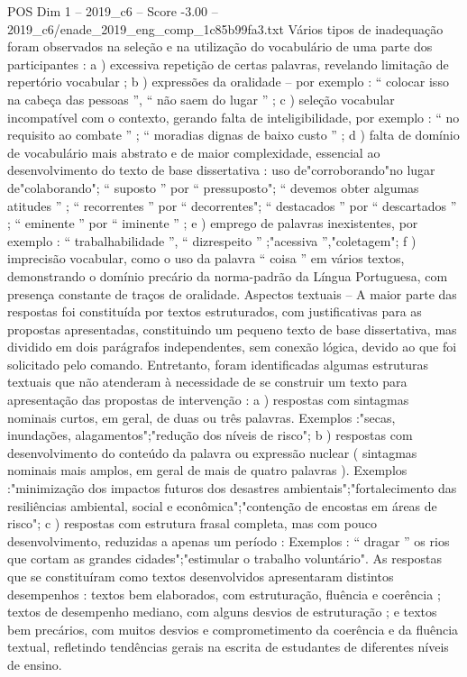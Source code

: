 \begin{textsample}{POS Dim 1 – 2019\_c6 – Score -3.00 – 2019\_c6/enade\_2019\_eng\_comp\_1c85b99fa3.txt}
Vários tipos de inadequação foram observados na seleção e na utilização do vocabulário de uma parte dos participantes : a ) excessiva repetição de certas palavras, revelando limitação de repertório vocabular ; b ) expressões da oralidade – por exemplo : “ colocar isso na cabeça das pessoas ”, “ não saem do lugar ” ; c ) seleção vocabular incompatível com o contexto, gerando falta de inteligibilidade, por exemplo : “ no requisito ao combate ” ; “ moradias dignas de baixo custo ” ; d ) falta de domínio de vocabulário mais abstrato e de maior complexidade, essencial ao desenvolvimento do texto de base dissertativa : uso de"corroborando"no lugar de"colaborando"; “ suposto ” por “ pressuposto"; “ devemos obter algumas atitudes ” ; “ recorrentes ” por “ decorrentes"; “ destacados ” por “ descartados ” ; “ eminente ” por “ iminente ” ; e ) emprego de palavras inexistentes, por exemplo : “ trabalhabilidade ”, “ dizrespeito ” ;"acessiva ”,"coletagem"; f ) imprecisão vocabular, como o uso da palavra “ coisa ” em vários textos, demonstrando o domínio precário da norma-padrão da Língua Portuguesa, com presença constante de traços de oralidade.
Aspectos textuais – A maior parte das respostas foi constituída por textos estruturados, com justificativas para as propostas apresentadas, constituindo um pequeno texto de base dissertativa, mas dividido em dois parágrafos independentes, sem conexão lógica, devido ao que foi solicitado pelo comando.
Entretanto, foram identificadas algumas estruturas textuais que não atenderam à necessidade de se construir um texto para apresentação das propostas de intervenção : a ) respostas com sintagmas nominais curtos, em geral, de duas ou três palavras.
Exemplos :"secas, inundações, alagamentos";"redução dos níveis de risco"; b ) respostas com desenvolvimento do conteúdo da palavra ou expressão nuclear ( sintagmas nominais mais amplos, em geral de mais de quatro palavras ).
Exemplos :"minimização dos impactos futuros dos desastres ambientais";"fortalecimento das resiliências ambiental, social e econômica";"contenção de encostas em áreas de risco"; c ) respostas com estrutura frasal completa, mas com pouco desenvolvimento, reduzidas a apenas um período : Exemplos : “ dragar ” os rios que cortam as grandes cidades";"estimular o trabalho voluntário".
As respostas que se constituíram como textos desenvolvidos apresentaram distintos desempenhos : textos bem elaborados, com estruturação, fluência e coerência ; textos de desempenho mediano, com alguns desvios de estruturação ; e textos bem precários, com muitos desvios e comprometimento da coerência e da fluência textual, refletindo tendências gerais na escrita de estudantes de diferentes níveis de ensino.

\end{textsample}
